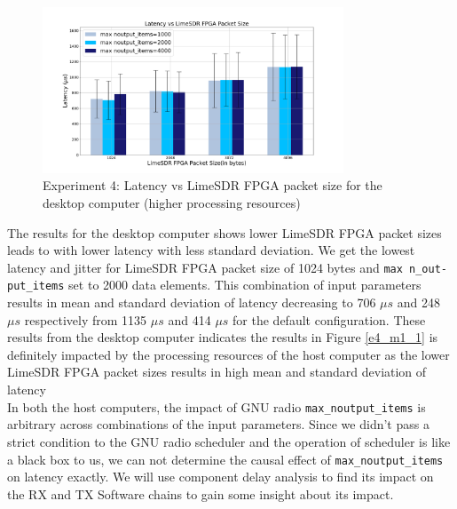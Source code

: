 \begin{figure}[h!]
\centering
\includegraphics[width=0.8\textwidth]{Thesis/Figure/E4_M2_1.png}
\caption{Experiment 4: Latency vs LimeSDR FPGA packet size for the desktop computer (higher processing resources)}
\label{e4_m2_1}
\end{figure}

The results for the desktop computer shows lower LimeSDR FPGA packet sizes leads to with lower latency with less standard deviation.
We get the lowest latency and jitter for LimeSDR FPGA packet size of 1024 bytes and \texttt{max  n\_out-\\put\_items} set to 2000 data elements.
This combination of input parameters results in mean and standard deviation of latency decreasing to 706 $\mu s$ and 248 $\mu s$ respectively from 1135 $\mu s$ and 414 $\mu s$ for the default configuration.
These results from the desktop computer indicates the results in Figure \ref{e4_m1_1} is definitely impacted by the processing resources of the host computer as the lower LimeSDR FPGA packet sizes results in high mean and standard deviation of latency\\

In both the host computers, the impact of GNU radio \texttt{max\_noutput\_items} is arbitrary across combinations of the input parameters.
Since we didn't pass a strict condition to the GNU radio scheduler and the operation of scheduler is like a black box to us, we can not determine the causal effect of \texttt{max\_noutput\_items} on latency exactly.
We will use component delay analysis to find its impact on the RX and TX Software chains to gain some insight about its impact.\\

